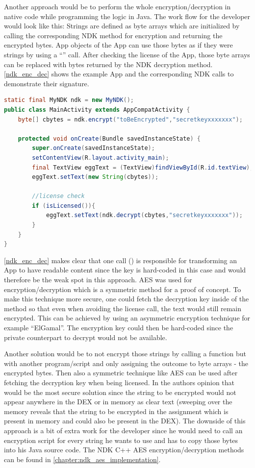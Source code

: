 Another approach would be to perform the whole encryption/decryption
in native code while programming the logic in Java. The work flow for the developer would look like this: Strings are defined as byte arrays which are initialized by calling the corresponding NDK method for encryption and
returning the encrypted bytes. App objects of the App can use those bytes
as if they were strings by using a ``'' call.
After checking the license of the App, those byte arrays can be replaced
with bytes returned by the NDK decryption method. \autoref{ndk_enc_dec}
shows the example App and the corresponding NDK calls to demonstrate their signature.
\begin{lstlisting}[language=Java, caption=NDK Encryption/Decryption, label=ndk_enc_dec]
static final MyNDK ndk = new MyNDK();
public class MainActivity extends AppCompatActivity {
    byte[] cbytes = ndk.encrypt("toBeEncrypted","secretkeyxxxxxxx");

    protected void onCreate(Bundle savedInstanceState) {
        super.onCreate(savedInstanceState);
        setContentView(R.layout.activity_main);
        final TextView eggText = (TextView)findViewById(R.id.textView);
        eggText.setText(new String(cbytes));

        //license check
        if (isLicensed()){
            eggText.setText(ndk.decrypt(cbytes,"secretkeyxxxxxxx"));
        }
    }
}
\end{lstlisting}
\autoref{ndk_enc_dec} makes clear that one call () is
responsible for transforming an App to have readable content since the key
is hard-coded in this case and would therefore be the weak spot in this approach.
AES was used for encryption/decryption which is a symmetric method for a proof of concept. To make this technique more secure, one could fetch the decryption
key inside of the  method so that even when avoiding the
license call, the text would still remain encrypted. This can be achieved
by using an asymmetric encryption technique for example ``ElGamal''.
The encryption key could then be hard-coded since the private counterpart
to decrypt would not be available.

Another solution would be to not encrypt
those strings by calling a function but with another program/script and only assigning the outcome to byte arrays - the encrypted bytes.
Then also a symmetric technique like AES can be used
after fetching the decryption key when being licensed. In the authors opinion
that would be the most secure solution since the string to be encrypted
would not appear anywhere in the DEX or in memory as clear text
(sweeping over the memory reveals that the string to be encrypted in the assignment  which is present in memory and could also be present in the DEX).
The downside of this approach is a bit of extra work for the developer since he would need to call an encryption script for every string he wants to use and has to copy
those bytes into his Java source code.
The NDK C++ AES encryption/decryption methods can be found in \autoref{chapter:ndk_aes_implementation}.

